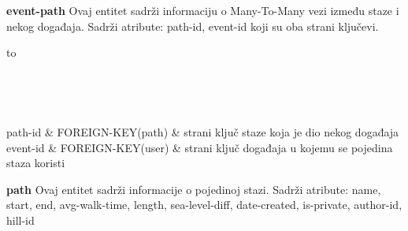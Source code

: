 			\textbf{event-path} Ovaj entitet sadrži informaciju o Many-To-Many vezi između staze i nekog događaja. Sadrži atribute: path-id, event-id koji su oba strani ključevi.
			
			\begin{longtabu} to \textwidth {|X[6, l]|X[6, l]|X[20, l]|}
				
				\hline {}	 \\[3pt] \hline
				\endfirsthead
				
				\hline {}	 \\[3pt] \hline
				\endhead
				
				\hline 
				\endlastfoot
				
				path-id & FOREIGN-KEY(path)	&  	strani ključ staze koja je dio nekog događaja	\\ \hline
				event-id	& FOREIGN-KEY(user) &  strani ključ događaja u kojemu se pojedina staza koristi	\\ \hline 
				
				
			\end{longtabu}
			\vspace{10mm}

			\textbf{path} Ovaj entitet sadrži informacije o pojedinoj stazi. Sadrži atribute: name, start, end, avg-walk-time, length, sea-level-diff, date-created, is-private, author-id, hill-id
			
